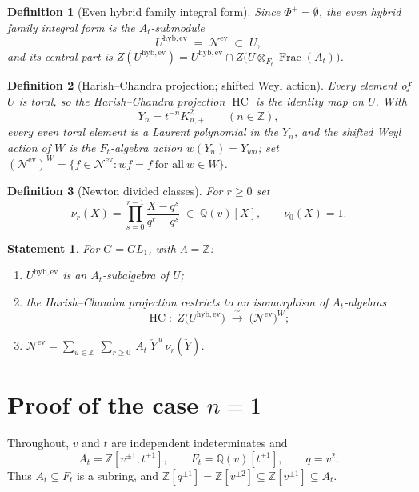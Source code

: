 \documentclass[11pt]{article}
\newtheorem{definition}{Definition}
\newtheorem*{goal}{Statement}
\newcommand{\At}{A_t}
\newcommand{\Ft}{F_t}
\newcommand{\Nev}{\mathcal N^{\mathrm{ev}}}
\newcommand{\Uev}{U^{\mathrm{hyb,ev}}}
\newcommand{\HC}{\operatorname{HC}}
\newcommand{\Yc}{\check Y}
\newcommand{\Z}{\mathbb Z}
\begin{document}
\begin{definition}[Even hybrid family integral form]\label{def:uev}
Since $\Phi^{+}=\emptyset$, the \emph{even hybrid family integral form} is the
$\At$-submodule
\[
  \Uev\;=\;\Nev\;\subset\;U,
\]
and its \emph{central part} is
$Z(\Uev)=\Uev\cap Z\bigl(U\otimes_{\Ft}\operatorname{Frac}(\At)\bigr)$.
\end{definition}

\begin{definition}[Harish--Chandra projection; shifted Weyl action]\label{def:hc}
Every element of $U$ is toral, so the \emph{Harish--Chandra projection} $\HC$ is
the identity map on $U$. With
\[
  Y_n=t^{-n}K_{n,+}^{2}\qquad(n\in\mathbb Z),
\]
every even toral element is a Laurent polynomial in the $Y_n$, and the
\emph{shifted Weyl action} of $W$ is the $\Ft$-algebra action
$w(Y_n)=Y_{wn}$; set $(\Nev)^{W}=\{f\in\Nev: wf=f\ \text{for all}\ w\in W\}$.
\end{definition}

\begin{definition}[Newton divided classes]\label{def:nu}
For $r\ge0$ set
\[
  \nu_{r}(X)=\prod_{s=0}^{r-1}\frac{X-q^{s}}{q^{r}-q^{s}}\;\in\;\mathbb Q(v)[X],
  \qquad \nu_0(X)=1 .
\]
\end{definition}

\begin{goal}\label{goal:main}
For $G=GL_1$, with $\Lambda=\mathbb Z$:
\begin{enumerate}
  \item[(i)] $\Uev$ is an $\At$-subalgebra of $U$;
  \item[(ii)] the Harish--Chandra projection restricts to an isomorphism of
  $\At$-algebras
  \[
    \HC:\;Z\bigl(\Uev\bigr)\;\xrightarrow{\ \sim\ }\;\bigl(\Nev\bigr)^{W};
  \]
  \item[(iii)] $\displaystyle
    \Nev=\sum_{u\in\mathbb Z}\ \sum_{r\ge0}\ \At\;\Yc^{\,u}\,\nu_{r}(\Yc)$.
\end{enumerate}
\end{goal}

\section{Proof of the case $n=1$}

Throughout, $v$ and $t$ are independent indeterminates and
\[
  \At=\Z[v^{\pm1},t^{\pm1}],\qquad
  \Ft=\mathbb Q(v)[t^{\pm1}],\qquad
  q=v^{2}.
\]
Thus $\At\subseteq\Ft$ is a subring, and $\Z[q^{\pm1}]=\Z[v^{\pm2}]\subseteq
\Z[v^{\pm1}]\subseteq\At$.
\end{document}
